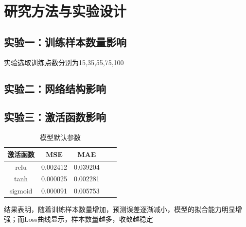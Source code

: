 \chapter{研究方法与实验设计}
\label{cha:thirdsection}

\section{实验一：训练样本数量影响}
实验选取训练点数分别为15,35,55,75,100


\section{实验二：网络结构影响}

\section{实验三：激活函数影响}
\begin{table}[htbp]
  \centering
  \caption{模型默认参数}
    \begin{tabular}{ccccc}
    \toprule
    激活函数 & MSE & MAE \\
    \midrule
        relu & 0.002412 & 0.039204 \\
        tanh & 0.000025 & 0.002281 \\
        sigmoid & 0.000091 & 0.005753 \\ 
    \bottomrule
    \end{tabular}%
  \label{Tab4-1}%
\end{table}%

结果表明，随着训练样本数量增加，预测误差逐渐减小，模型的拟合能力明显增强；而Loss曲线显示，样本数量越多，收敛越稳定